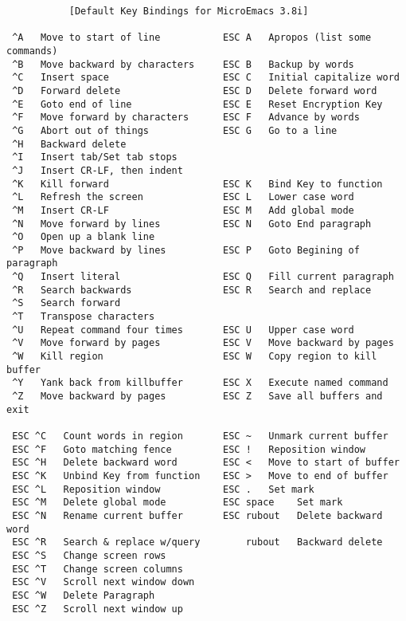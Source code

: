 \begin{verbatim}
           [Default Key Bindings for MicroEmacs 3.8i]

 ^A   Move to start of line           ESC A   Apropos (list some commands)
 ^B   Move backward by characters     ESC B   Backup by words
 ^C   Insert space                    ESC C   Initial capitalize word
 ^D   Forward delete                  ESC D   Delete forward word
 ^E   Goto end of line                ESC E   Reset Encryption Key
 ^F   Move forward by characters      ESC F   Advance by words
 ^G   Abort out of things             ESC G   Go to a line
 ^H   Backward delete
 ^I   Insert tab/Set tab stops
 ^J   Insert CR-LF, then indent
 ^K   Kill forward                    ESC K   Bind Key to function
 ^L   Refresh the screen              ESC L   Lower case word
 ^M   Insert CR-LF                    ESC M   Add global mode
 ^N   Move forward by lines           ESC N   Goto End paragraph
 ^O   Open up a blank line
 ^P   Move backward by lines          ESC P   Goto Begining of paragraph
 ^Q   Insert literal                  ESC Q   Fill current paragraph
 ^R   Search backwards                ESC R   Search and replace
 ^S   Search forward
 ^T   Transpose characters
 ^U   Repeat command four times       ESC U   Upper case word
 ^V   Move forward by pages           ESC V   Move backward by pages
 ^W   Kill region                     ESC W   Copy region to kill buffer
 ^Y   Yank back from killbuffer       ESC X   Execute named command
 ^Z   Move backward by pages          ESC Z   Save all buffers and exit

 ESC ^C   Count words in region       ESC ~   Unmark current buffer
 ESC ^F   Goto matching fence         ESC !   Reposition window
 ESC ^H   Delete backward word        ESC <   Move to start of buffer
 ESC ^K   Unbind Key from function    ESC >   Move to end of buffer
 ESC ^L   Reposition window           ESC .   Set mark
 ESC ^M   Delete global mode          ESC space    Set mark
 ESC ^N   Rename current buffer       ESC rubout   Delete backward word
 ESC ^R   Search & replace w/query        rubout   Backward delete
 ESC ^S   Change screen rows
 ESC ^T   Change screen columns
 ESC ^V   Scroll next window down
 ESC ^W   Delete Paragraph
 ESC ^Z   Scroll next window up


\end{verbatim}
